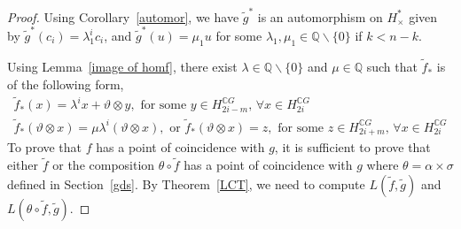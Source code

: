 \documentclass{amsart}
\newcommand{\thmref}[1]{Theorem~\ref{#1}}
\newcommand{\secref}[1]{Section~\ref{#1}}
\newcommand{\lemref}[1]{Lemma~\ref{#1}}
\newcommand{\corref}[1]{Corollary~\ref{#1}}
\begin{document}
\begin{proof}
	Using \corref{automor}, we have $\tilde g^*$ is an automorphism on $H^*_{\times}$ given by
	$\tilde g^*(c_i) = \lambda_1^i c_i$, and $\tilde g^*(u) = \mu_1 u$ for some $\lambda_1, \mu_1 \in \mathbb{Q}\backslash \{0\}$ if $k<n-k$.
	
	Using \lemref{image of homf}, there exist $\lambda \in \mathbb{Q}\backslash \{0\}$ and $\mu \in \mathbb{Q}$ such that $\tilde{f}_*$ is of the following form, 
	\begin{equation}\label{flower star}
		\begin{split}
			\tilde f_*(x)=\lambda^ix+\vartheta\otimes y, \text{ for some }y\in H_{2i-m}^{\mathbb CG}, \, \forall x \in H_{2i}^{\mathbb{C}G}\\
			\tilde f_*(\vartheta\otimes x)=\mu\lambda^i (\vartheta\otimes x) , \text{ or } \tilde{f}_*(\vartheta \otimes x) = z, \text{ for some }z\in H_{2i+m}^{\mathbb CG},\, \forall x \in H_{2i}^{\mathbb{C}G}
		\end{split}
	\end{equation}
	To prove that $f$ has a point of coincidence with $g$, it is sufficient to prove that either $\tilde{f}$ or the composition $\theta \circ \tilde{f} $ has a point of coincidence with $g$ where $\theta = \alpha \times \sigma$ defined in \secref{gds}. By \thmref{LCT}, we need to compute $L(\tilde f, \tilde g)$ and $L(\theta \circ \tilde f, \tilde g)$.
	

\end{proof}
\end{document}
